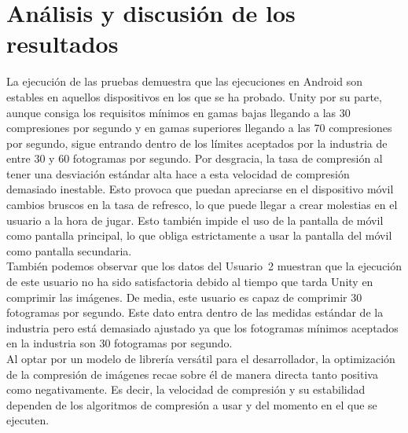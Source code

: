 \section{An\'alisis y discusi\'on de los resultados}
La ejecuci\'on de las pruebas demuestra que las ejecuciones en Android son estables en aquellos dispositivos en los que se ha probado. Unity por su parte, aunque consiga los requisitos m\'inimos en gamas bajas llegando a las 30 compresiones por segundo y en gamas superiores llegando a las 70 compresiones por segundo, sigue entrando  dentro de los l\'imites aceptados por la industria de entre 30 y 60 fotogramas por segundo. Por desgracia, la tasa de compresi\'on al tener una desviaci\'on est\'andar alta hace a esta velocidad de compresi\'on demasiado inestable. Esto provoca que puedan apreciarse en el dispositivo m\'ovil cambios bruscos en la tasa de refresco, lo que puede llegar a crear molestias en el usuario a la hora de jugar. Esto tambi\'en impide el uso de la pantalla de m\'ovil como pantalla principal, lo que obliga estrictamente a usar la pantalla del m\'ovil como pantalla secundaria.\\

Tambi\'en podemos observar que los datos del Usuario~2 muestran que la ejecuci\'on de este usuario no ha sido satisfactoria debido al tiempo que tarda Unity en comprimir las im\'agenes. De media, este usuario es capaz de comprimir 30 fotogramas por segundo. Este dato entra dentro de las medidas est\'andar de la industria pero est\'a demasiado ajustado ya que los fotogramas m\'inimos aceptados en la industria son 30 fotogramas por segundo.\\

Al optar por un modelo de librer\'ia vers\'atil para el desarrollador, la optimizaci\'on de la compresi\'on de im\'agenes recae sobre \'el de manera directa tanto positiva como negativamente. Es decir, la velocidad de compresi\'on y su estabilidad dependen de los algoritmos de compresi\'on a usar y del momento en el que se ejecuten.\\



